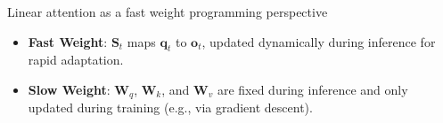 


\begin{frame}{Linear attention as a fast weight programming perspective}
    
        
    
\vspace{-4mm}
\begin{itemize}
    \item {\color{red}\textbf{Fast Weight}}: $\mathbf{S}_t$ maps $\mathbf{q}_t$ to $\mathbf{o}_t$, updated dynamically during inference  for rapid adaptation.
    \item {\color{red}\textbf{Slow Weight}}: $\mathbf{W}_q$, $\mathbf{W}_k$, and $\mathbf{W}_v$ are fixed during inference and only updated during training (e.g., via gradient descent).
\end{itemize}




\end{frame}

